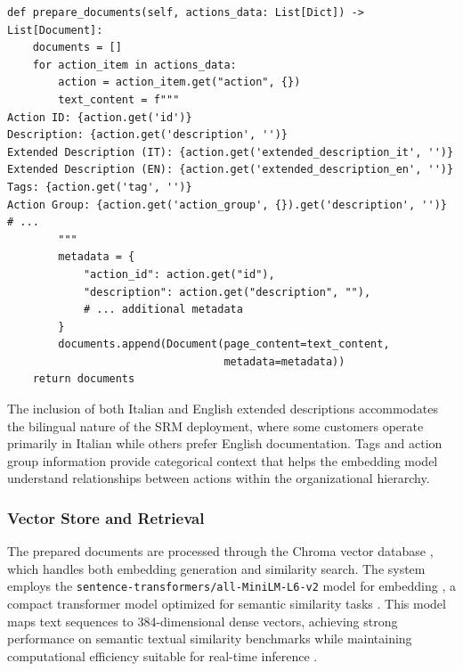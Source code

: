\begin{listing}[htbp]
\begin{verbatim}
def prepare_documents(self, actions_data: List[Dict]) -> List[Document]:
    documents = []
    for action_item in actions_data:
        action = action_item.get("action", {})
        text_content = f"""
Action ID: {action.get('id')}
Description: {action.get('description', '')}
Extended Description (IT): {action.get('extended_description_it', '')}
Extended Description (EN): {action.get('extended_description_en', '')}
Tags: {action.get('tag', '')}
Action Group: {action.get('action_group', {}).get('description', '')}
# ...
        """
        metadata = {
            "action_id": action.get("id"),
            "description": action.get("description", ""),
            # ... additional metadata
        }
        documents.append(Document(page_content=text_content, 
                                  metadata=metadata))
    return documents
\end{verbatim}
\caption{Document Preparation for Catalog Actions}
\label{lst:document_prep}
\end{listing}

The inclusion of both Italian and English extended descriptions accommodates the bilingual nature of the SRM deployment, where some customers operate primarily in Italian while others prefer English documentation. Tags and action group information provide categorical context that helps the embedding model understand relationships between actions within the organizational hierarchy.

\subsubsection{Vector Store and Retrieval}

The prepared documents are processed through the Chroma vector database \cite{survey_vector_databases}, which handles both embedding generation and similarity search. The system employs the \texttt{sentence-transformers/all-MiniLM-L6-v2} model for embedding \cite{wang2020minilm}, a compact transformer model optimized for semantic similarity tasks \cite{wang2020minilm}\cite{reimers2019sentencebertsentenceembeddingsusing}. This model maps text sequences to 384-dimensional dense vectors, achieving strong performance on semantic textual similarity benchmarks while maintaining computational efficiency suitable for real-time inference \cite{wang2020minilm}.

